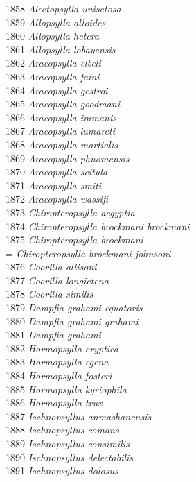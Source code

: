 \documentclass[
]{article}
\begin{document}
1858 \emph{Alectopsylla unisetosa}\\
1859 \emph{Allopsylla alloides}\\
1860 \emph{Allopsylla hetera}\\
1861 \emph{Allopsylla lobayensis}\\
1862 \emph{Araeopsylla elbeli}\\
1863 \emph{Araeopsylla faini}\\
1864 \emph{Araeopsylla gestroi}\\
1865 \emph{Araeopsylla goodmani}\\
1866 \emph{Araeopsylla immanis}\\
1867 \emph{Araeopsylla lumareti}\\
1868 \emph{Araeopsylla martialis}\\
1869 \emph{Araeopsylla phnomensis}\\
1870 \emph{Araeopsylla scitula}\\
1871 \emph{Araeopsylla smiti}\\
1872 \emph{Araeopsylla wassifi}\\
1873 \emph{Chiropteropsylla aegyptia}\\
1874 \emph{Chiropteropsylla brockmani brockmani}\\
1875 \emph{Chiropteropsylla brockmani}\\
= \emph{Chiropteropsylla brockmani johnsoni}\\
1876 \emph{Coorilla allisoni}\\
1877 \emph{Coorilla longictena}\\
1878 \emph{Coorilla similis}\\
1879 \emph{Dampfia grahami equatoris}\\
1880 \emph{Dampfia grahami grahami}\\
1881 \emph{Dampfia grahami}\\
1882 \emph{Hormopsylla cryptica}\\
1883 \emph{Hormopsylla egena}\\
1884 \emph{Hormopsylla fosteri}\\
1885 \emph{Hormopsylla kyriophila}\\
1886 \emph{Hormopsylla trux}\\
1887 \emph{Ischnopsyllus anmashanensis}\\
1888 \emph{Ischnopsyllus comans}\\
1889 \emph{Ischnopsyllus consimilis}\\
1890 \emph{Ischnopsyllus delectabilis}\\
1891 \emph{Ischnopsyllus dolosus}\\
\end{document}

